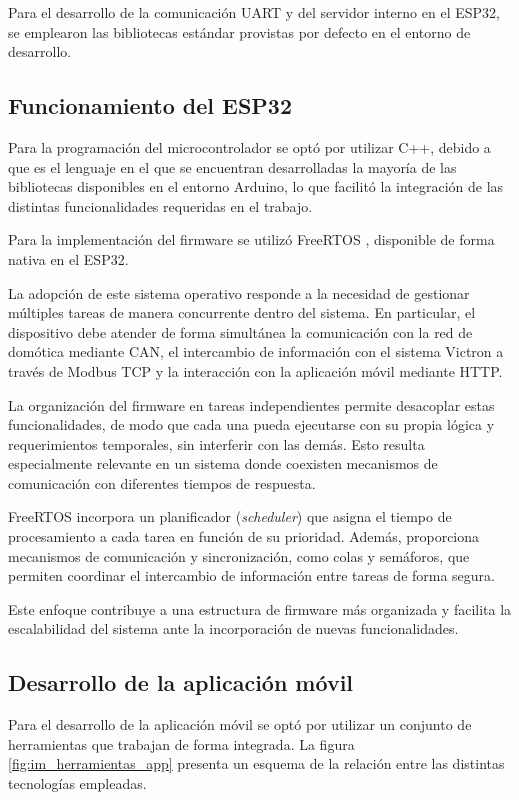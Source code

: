 Para el desarrollo de la comunicación UART y del servidor interno en el
ESP32, se emplearon las bibliotecas estándar provistas por defecto en el
entorno de desarrollo.

\subsection{Funcionamiento del ESP32}
\label{sec:rtos}

Para la programación del microcontrolador se optó por utilizar C++, debido a que es el lenguaje en el que se encuentran desarrolladas la mayoría de las bibliotecas disponibles en el entorno Arduino, lo que facilitó la integración de las distintas funcionalidades requeridas en el trabajo.

Para la implementación del firmware se utilizó FreeRTOS \citep{web_freertos}, disponible de forma nativa en el ESP32.

La adopción de este sistema operativo responde a la necesidad de gestionar múltiples tareas de manera concurrente dentro del sistema. En particular, el dispositivo debe atender de forma simultánea la comunicación con la red de domótica mediante CAN, el intercambio de información con el sistema Victron a través de Modbus TCP y la interacción con la aplicación móvil mediante HTTP.

La organización del firmware en tareas independientes permite desacoplar estas funcionalidades, de modo que cada una pueda ejecutarse con su propia lógica y requerimientos temporales, sin interferir con las demás. Esto resulta especialmente relevante en un sistema donde coexisten mecanismos de comunicación con diferentes tiempos de respuesta.

FreeRTOS incorpora un planificador (\textit{scheduler}) que asigna el tiempo de procesamiento a cada tarea en función de su prioridad. Además, proporciona mecanismos de comunicación y sincronización, como colas y semáforos, que permiten coordinar el intercambio de información entre tareas de forma segura.

Este enfoque contribuye a una estructura de firmware más organizada y facilita la escalabilidad del sistema ante la incorporación de nuevas funcionalidades.

\subsection{Desarrollo de la aplicación móvil}

Para el desarrollo de la aplicación móvil se optó por utilizar un conjunto de herramientas que trabajan de forma integrada. La figura \ref{fig:im_herramientas_app} presenta un esquema de la relación entre las distintas tecnologías empleadas.

